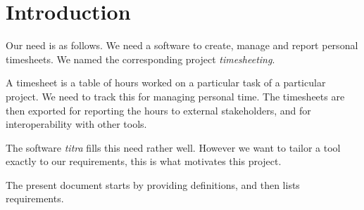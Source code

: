 \section{Introduction}
Our need is as follows. We need a software to create, manage and report
personal timesheets. We named the corresponding project \emph{timesheeting}.

A timesheet is a table of hours worked on a particular task of a particular
project. We need to track this for managing personal time. The timesheets
are then exported for reporting the hours to external stakeholders, and
for interoperability with other tools.

The software \emph{titra} \cite{titra} fills this need rather well. However
we want to tailor a tool exactly to our requirements, this is what motivates
this project.

The present document starts by providing definitions, and then lists
requirements.